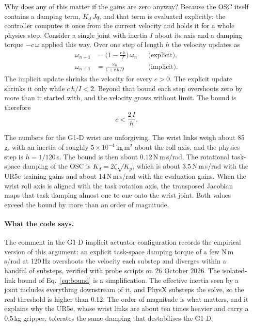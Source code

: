 Why does any of this matter if the gains are zero anyway? Because the OSC itself contains a damping term, $K_d\,J\dot q$, and that term is evaluated explicitly: the controller computes it once from the current velocity and holds it for a whole physics step. Consider a single joint with inertia $I$ about its axis and a damping torque $-c\,\omega$ applied this way. Over one step of length $h$ the velocity updates as
\begin{equation}
\begin{aligned}
  \omega_{n+1} &= \Big(1 - \frac{c\,h}{I}\Big)\,\omega_n &&\text{(explicit)},\\
  \omega_{n+1} &= \frac{\omega_n}{1 + c\,h/I} &&\text{(implicit)}.
\end{aligned}
\end{equation}
The implicit update shrinks the velocity for every $c>0$. The explicit update shrinks it only while $c\,h/I < 2$. Beyond that bound each step overshoots zero by more than it started with, and the velocity grows without limit. The bound is therefore
\begin{equation}
  c < \frac{2\,I}{h}.
  \label{eq:bound}
\end{equation}

The numbers for the G1-D wrist are unforgiving. The wrist links weigh about 85\,g, with an inertia of roughly $5\times10^{-4}$\,kg\,m$^2$ about the roll axis, and the physics step is $h = 1/120$\,s. The bound is then about $0.12$\,N\,m\,s/rad. The rotational task-space damping of the OSC is $K_d = 2\zeta\sqrt{K_p}$, which is about $3.5$\,N\,m\,s/rad with the UR5e training gains and about $14$\,N\,m\,s/rad with the evaluation gains. When the wrist roll axis is aligned with the task rotation axis, the transposed Jacobian maps that task damping almost one to one onto the wrist joint. Both values exceed the bound by more than an order of magnitude.

\paragraph{What the code says.} The comment in the G1-D implicit actuator configuration records the empirical version of this argument: an explicit task-space damping torque of a few N\,m\,s/rad at 120\,Hz overshoots the velocity each substep and diverges within a handful of substeps, verified with probe scripts on 26 October 2026. The isolated-link bound of Eq.~\eqref{eq:bound} is a simplification. The effective inertia seen by a joint includes everything downstream of it, and PhysX substeps the solve, so the real threshold is higher than $0.12$. The order of magnitude is what matters, and it explains why the UR5e, whose wrist links are about ten times heavier and carry a 0.5\,kg gripper, tolerates the same damping that destabilises the G1-D.

